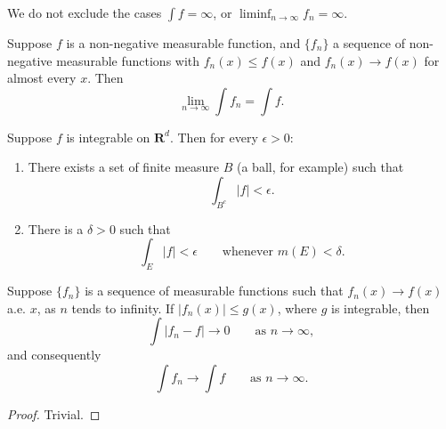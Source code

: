 \begin{remark}
  We do not exclude the cases $\int f = \infty$,
  or $\liminf_{n \to \infty} f_n = \infty$.
\end{remark}

\begin{corollary}
  Suppose $f$ is a non-negative measurable function, and $\{f_n\}$ a sequence
  of non-negative measurable functions with
  $f_n(x) \leq f(x)$ and $f_n(x) \to f(x)$ for almost every $x$. Then
  \begin{equation}
    \lim_{n \to \infty} \int f_n = \int f.
  \end{equation}
\end{corollary}

\begin{proposition}
  Suppose $f$ is integrable on $\mathbf{R}^d$. Then for every $\epsilon > 0$:
  \begin{enumerate}
    \renewcommand{\theenumi}{\roman{enumi}}
    \item There exists a set of finite measure $B$ (a ball, for example) such that
          \begin{equation}
            \int_{B^c} |f| < \epsilon.
          \end{equation}
    \item There is a $\delta > 0$ such that
          \begin{equation}
            \int_E |f| < \epsilon \qquad \text{whenever } m(E) < \delta.
          \end{equation}
  \end{enumerate}
\end{proposition}

\begin{theorem}
  Suppose $\{f_n\}$ is a sequence of measurable functions such that
  $f_n(x) \to f(x)$ a.e. $x$, as $n$ tends to infinity.
  If $|f_n(x)| \leq g(x)$, where $g$ is integrable, then
  \begin{equation}
    \int |f_n - f| \to 0 \qquad \text{as } n \to \infty,
  \end{equation}
  and consequently
  \begin{equation}
    \int f_n \to \int f \qquad \text{as } n \to \infty.
  \end{equation}
\end{theorem}

\begin{proof}
  Trivial.
\end{proof}




